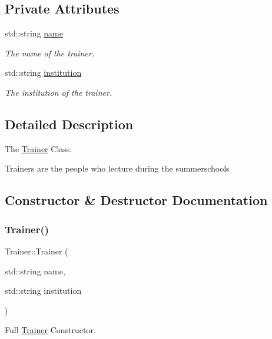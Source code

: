 \subsection*{Private Attributes}
\begin{DoxyCompactItemize}
\item 
std\+::string \mbox{\hyperlink{classTrainer_a6b58d4cfdb8d3482cb2c09dd366a6350}{name}}
\begin{DoxyCompactList}\small\item\em The name of the trainer. \end{DoxyCompactList}\item 
std\+::string \mbox{\hyperlink{classTrainer_ae895aa7f146d8bf271399215d4ede36b}{institution}}
\begin{DoxyCompactList}\small\item\em The institution of the trainer. \end{DoxyCompactList}\end{DoxyCompactItemize}


\subsection{Detailed Description}
The \mbox{\hyperlink{classTrainer}{Trainer}} Class. 

Trainers are the people who lecture during the summerschools 

\subsection{Constructor \& Destructor Documentation}
\mbox{\label{classTrainer_ae033382eaedd47966c8667439376369a}} 
\subsubsection{\texorpdfstring{Trainer()}{Trainer()}}
{\footnotesize\ttfamily Trainer\+::\+Trainer (\begin{DoxyParamCaption}\item[{std\+::string}]{name,  }\item[{std\+::string}]{institution }\end{DoxyParamCaption})\hspace{0.3cm}{\ttfamily [inline]}}



Full \mbox{\hyperlink{classTrainer}{Trainer}} Constructor. 


